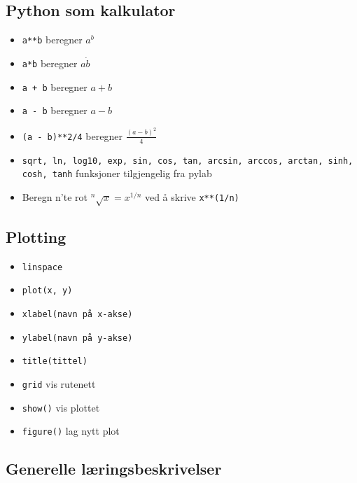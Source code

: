 \documentclass[11pt]{article}
\providecommand{\tightlist}{%
      \setlength{\itemsep}{0pt}\setlength{\parskip}{0pt}}
\begin{document}
\hypertarget{python-som-kalkulator}{%
\subsection{Python som kalkulator}\label{python-som-kalkulator}}

\begin{itemize}
\tightlist
\item
  \texttt{a**b} beregner \(a^b\)
\item
  \texttt{a*b} beregner \(a\dot b\)
\item
  \texttt{a\ +\ b} beregner \(a + b\)
\item
  \texttt{a\ -\ b} beregner \(a - b\)
\item
  \texttt{(a\ -\ b)**2/4} beregner \(\displaystyle \frac{(a - b)^2}{4}\)
\item
  \texttt{sqrt,\ ln,\ log10,\ exp,\ sin,\ cos,\ tan,\ arcsin,\ arccos,\ arctan,\ sinh,\ cosh,\ tanh}
  funksjoner tilgjengelig fra pylab
\item
  Beregn n'te rot \(^n\sqrt{x} = x^{1/n}\) ved å skrive
  \texttt{x**(1/n)}
\end{itemize}

\hypertarget{plotting}{%
\subsection{Plotting}\label{plotting}}

\begin{itemize}
\tightlist
\item
  \texttt{linspace}
\item
  \texttt{plot(x,\ y)}
\item
  \texttt{xlabel(\textquotesingle{}navn\ på\ x-akse\textquotesingle{})}
\item
  \texttt{ylabel(\textquotesingle{}navn\ på\ y-akse\textquotesingle{})}
\item
  \texttt{title(\textquotesingle{}tittel\textquotesingle{})}
\item
  \texttt{grid} vis rutenett
\item
  \texttt{show()} vis plottet
\item
  \texttt{figure()} lag nytt plot
\end{itemize}

    \hypertarget{generelle-luxe6ringsbeskrivelser}{%
\subsection{Generelle
læringsbeskrivelser}\label{generelle-luxe6ringsbeskrivelser}}
\end{document}
